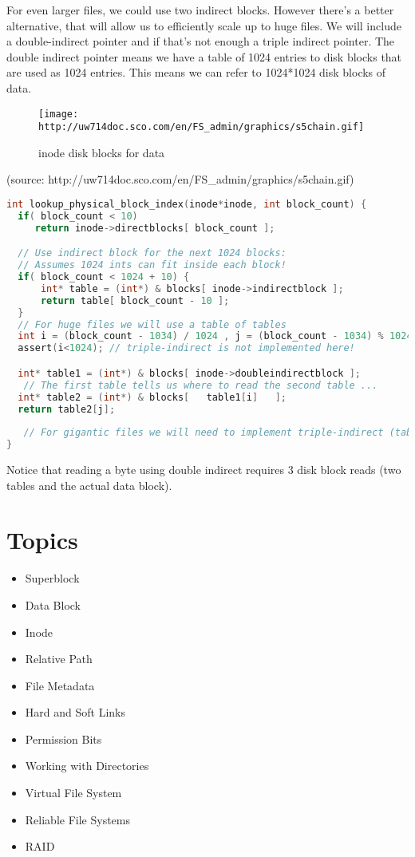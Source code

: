 For even larger files, we could use two indirect blocks. However there's a better alternative, that will allow us to efficiently scale up to huge files. We will include a double-indirect pointer and if that's not enough a triple indirect pointer. The double indirect pointer means we have a table of 1024 entries to disk blocks that are used as 1024 entries. This means we can refer to 1024*1024 disk blocks of data.

\begin{figure}[htbp]
\centering
\texttt{[image: http://uw714doc.sco.com/en/FS\_admin/graphics/s5chain.gif]}
\caption{inode disk blocks for data}
\end{figure}

(source: http://uw714doc.sco.com/en/FS\_admin/graphics/s5chain.gif)

\begin{lstlisting}[language=C]
int lookup_physical_block_index(inode*inode, int block_count) {
  if( block_count < 10)
     return inode->directblocks[ block_count ];

  // Use indirect block for the next 1024 blocks:
  // Assumes 1024 ints can fit inside each block!
  if( block_count < 1024 + 10) {   
      int* table = (int*) & blocks[ inode->indirectblock ];
      return table[ block_count - 10 ];
  }
  // For huge files we will use a table of tables
  int i = (block_count - 1034) / 1024 , j = (block_count - 1034) % 1024;
  assert(i<1024); // triple-indirect is not implemented here!

  int* table1 = (int*) & blocks[ inode->doubleindirectblock ];
   // The first table tells us where to read the second table ...
  int* table2 = (int*) & blocks[   table1[i]   ];
  return table2[j];
 
   // For gigantic files we will need to implement triple-indirect (table of tables of tables)
}
\end{lstlisting}

Notice that reading a byte using double indirect requires 3 disk block reads (two tables and the actual data block).

\section{Topics}\label{topics}

\begin{itemize}
\tightlist
\item
  Superblock
\item
  Data Block
\item
  Inode
\item
  Relative Path
\item
  File Metadata
\item
  Hard and Soft Links
\item
  Permission Bits
\item
  Working with Directories
\item
  Virtual File System
\item
  Reliable File Systems
\item
  RAID
\end{itemize}

